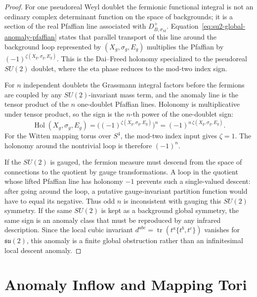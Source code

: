 \begin{proof}
For one pseudoreal Weyl doublet the fermionic functional integral is not an
ordinary complex determinant function on the space of backgrounds; it is a
section of the real Pfaffian line associated with
\(D_{B,\sigma_M}^+\).  Equation~\eqref{eq:su2-global-anomaly-pfaffian} states
that parallel transport of this line around the background loop represented
by \((X_g,\sigma_g,E_g)\) multiplies the Pfaffian by
\((-1)^{\zeta(X_g,\sigma_g,E_g)}\).  This is the Dai--Freed holonomy
specialized to the pseudoreal \(SU(2)\) doublet, where the eta phase reduces
to the mod-two index sign.

For \(n\) independent doublets the Grassmann integral factors before the
fermions are coupled by any \(SU(2)\)-invariant mass term, and the anomaly
line is the tensor product of the \(n\) one-doublet Pfaffian lines.  Holonomy
is multiplicative under tensor product, so the sign is the \(n\)-th power of
the one-doublet sign:
\[
  \operatorname{Hol}(X_g,\sigma_g,E_g)
  =
  \bigl((-1)^{\zeta(X_g,\sigma_g,E_g)}\bigr)^n
  =
  (-1)^{n\,\zeta(X_g,\sigma_g,E_g)} .
\]
For the Witten mapping torus over \(S^4\), the mod-two index input gives
\(\zeta=1\).  The holonomy around the nontrivial loop is therefore
\((-1)^n\).

If the \(SU(2)\) is gauged, the fermion measure must descend from the space
of connections to the quotient by gauge transformations.  A loop in the
quotient whose lifted Pfaffian line has holonomy \(-1\) prevents such a
single-valued descent: after going around the loop, a putative gauge-invariant
partition function would have to equal its negative.  Thus odd \(n\) is
inconsistent with gauging this \(SU(2)\) symmetry.  If the same \(SU(2)\) is
kept as a background global symmetry, the same sign is an anomaly class that
must be reproduced by any infrared description.  Since the local cubic
invariant \(d^{abc}=\operatorname{tr}(t^a\{t^b,t^c\})\) vanishes for
\(\mathfrak{su}(2)\), this anomaly is a finite global obstruction rather than
an infinitesimal local descent anomaly.
\end{proof}

\section{Anomaly Inflow and Mapping Tori}

